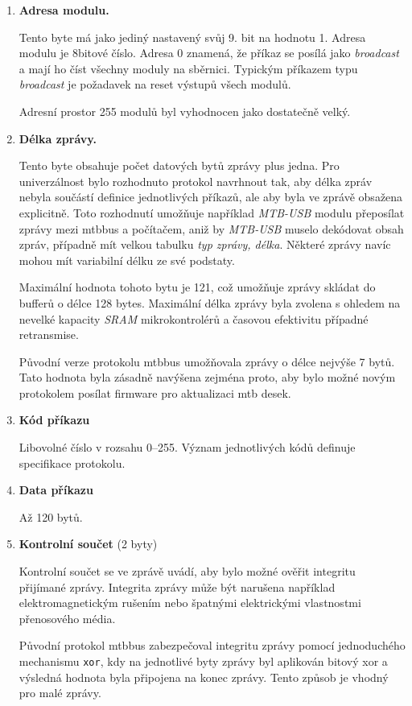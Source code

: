 \begin{enumerate}
\item \textbf{Adresa modulu.}

Tento byte má jako jediný nastavený svůj 9. bit na hodnotu 1.
Adresa modulu je 8bitové číslo. Adresa 0 znamená, že příkaz se posílá
jako \textit{broadcast} a mají ho číst všechny moduly na sběrnici. Typickým
příkazem typu \textit{broadcast} je požadavek na reset výstupů všech modulů.

Adresní prostor 255 modulů byl vyhodnocen jako dostatečně velký.

\item \textbf{Délka zprávy.}

Tento byte obsahuje počet datových bytů zprávy plus jedna. Pro univerzálnost bylo
rozhodnuto protokol navrhnout tak, aby délka zpráv nebyla součástí definice
jednotlivých příkazů, ale aby byla ve zprávě obsažena explicitně. Toto
rozhodnutí umožňuje například \textit{MTB-USB} modulu přeposílat zprávy mezi
\gls{mtbbus} a počítačem, aniž by \textit{MTB-USB} muselo dekódovat obsah
zpráv, případně mít velkou tabulku \textit{typ zprávy, délka}. Některé zprávy
navíc mohou mít variabilní délku ze své podstaty.

Maximální hodnota tohoto bytu je 121, což umožňuje zprávy skládat do bufferů o
délce 128 bytes. Maximální délka zprávy byla zvolena s ohledem na nevelké
kapacity \textit{SRAM} mikrokontrolérů a časovou efektivitu případné
retransmise.

Původní verze protokolu \gls{mtbbus} umožňovala zprávy o délce nejvýše 7 bytů.
Tato hodnota byla zásadně navýšena zejména proto, aby bylo možné novým
protokolem posílat firmware pro aktualizaci \gls{mtb} desek.

\item \textbf{Kód příkazu}

Libovolné číslo v rozsahu 0–255. Význam jednotlivých kódů definuje specifikace
protokolu.

\item \textbf{Data příkazu}

Až 120 bytů.

\item \textbf{Kontrolní součet} (2 byty)

Kontrolní součet se ve zprávě uvádí, aby bylo možné ověřit integritu přijímané
zprávy. Integrita zprávy může být narušena například elektromagnetickým rušením
nebo špatnými elektrickými vlastnostmi přenosového média.

Původní protokol \gls{mtbbus} zabezpečoval integritu zprávy pomocí jednoduchého
mechanismu \texttt{xor}, kdy na jednotlivé byty zprávy byl aplikován bitový xor
a výsledná hodnota byla připojena na konec zprávy. Tento způsob je vhodný pro
malé zprávy.


\end{enumerate}
